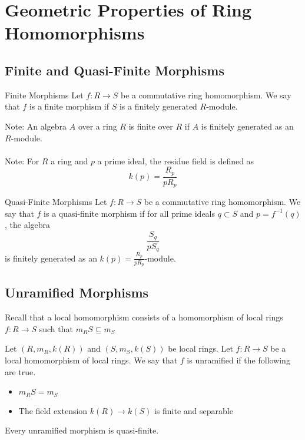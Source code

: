 \documentclass[a4paper]{article}
\begin{document}
\pagebreak
\section{Geometric Properties of Ring Homomorphisms}
\subsection{Finite and Quasi-Finite Morphisms}
\begin{defn}{Finite Morphisms}{} Let $f:R\to S$ be a commutative ring homomorphism. We say that $f$ is a finite morphism if $S$ is a finitely generated $R$-module. 
\end{defn}

Note: An algebra $A$ over a ring $R$ is finite over $R$ if $A$ is finitely generated as an $R$-module. \\~\\

Note: For $R$ a ring and $p$ a prime ideal, the residue field is defined as $$k(p)=\frac{R_p}{pR_p}$$

\begin{defn}{Quasi-Finite Morphisms}{} Let $f:R\to S$ be a commutative ring homomorphism. We say that $f$ is a quasi-finite morphism if for all prime ideals $q\subset S$ and $p=f^{-1}(q)$, the algebra $$\frac{S_q}{pS_q}$$ is finitely generated as an $k(p)=\frac{R_p}{pR_p}$-module. 
\end{defn}

\subsection{Unramified Morphisms}
Recall that a local homomorphism consists of a homomorphism of local rings $f:R\to S$ such that $m_RS\subseteq m_S$

\begin{defn}{}{} Let $(R,m_R,k(R))$ and $(S,m_S,k(S))$ be local rings. Let $f:R\to S$ be a local homomorphism of local rings. We say that $f$ is unramified if the following are true. 
\begin{itemize}
\item $m_RS=m_S$
\item The field extension $k(R)\to k(S)$ is finite and separable
\end{itemize}
\end{defn}

\begin{lmm}{}{} Every unramified morphism is quasi-finite. 
\end{lmm}
\end{document}
